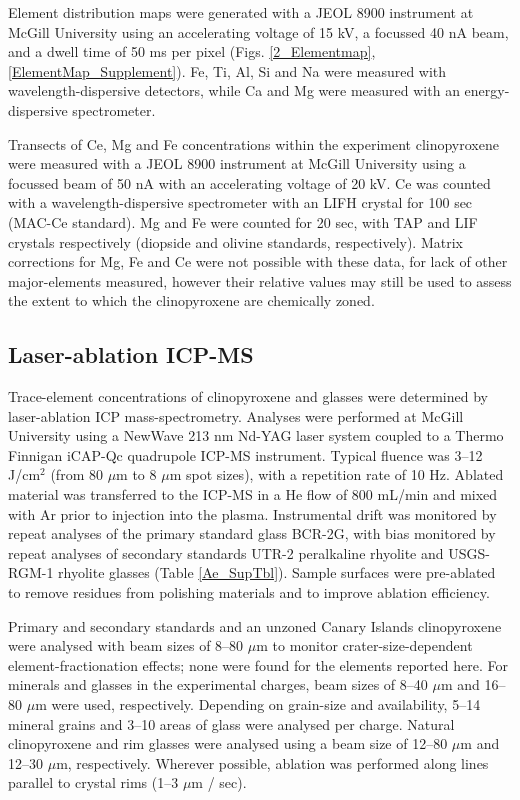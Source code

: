 \documentclass[review,authoryear,12pt]{elsarticle}
\begin{document}
Element distribution maps were generated with a JEOL 8900 instrument at McGill University using an accelerating voltage of 15 kV, a focussed 40 nA beam, and a dwell time of 50 ms per pixel (Figs. \ref{2_Elementmap}, \ref{ElementMap_Supplement}). Fe, Ti, Al, Si and Na were measured with wavelength-dispersive detectors, while Ca and Mg were measured with an energy-dispersive spectrometer.

Transects of Ce, Mg and Fe concentrations within the experiment clinopyroxene were measured with a JEOL 8900 instrument at McGill University using a focussed beam of 50 nA with an accelerating voltage of 20 kV. Ce was counted with a wavelength-dispersive spectrometer with an LIFH crystal for 100 sec (MAC-Ce standard). Mg and Fe were counted for 20 sec, with TAP and LIF crystals respectively (diopside and olivine standards, respectively). Matrix corrections for Mg, Fe and Ce were not possible with these data, for lack of other major-elements measured, however their relative values may still be used to assess the extent to which the clinopyroxene are chemically zoned.  

\subsection{Laser-ablation ICP-MS}
Trace-element concentrations of clinopyroxene and glasses were determined by laser-ablation ICP mass-spectrometry. Analyses were performed at McGill University using a NewWave 213 nm Nd-YAG laser system coupled to a Thermo Finnigan iCAP-Qc quadrupole ICP-MS instrument. Typical fluence was 3--12 J/cm$^2$ (from 80 $\mu$m to 8 $\mu$m spot sizes), with a repetition rate of 10 Hz. Ablated material was transferred to the ICP-MS in a He flow of 800 mL/min and mixed with Ar prior to injection into the plasma. Instrumental drift was monitored by repeat analyses of the primary standard glass BCR-2G, with bias monitored by repeat analyses of secondary standards UTR-2 peralkaline rhyolite and USGS-RGM-1 rhyolite glasses (Table \ref{Ae_SupTbl}). Sample surfaces were pre-ablated to remove residues from polishing materials and to improve ablation efficiency. 

Primary and secondary standards and an unzoned Canary Islands clinopyroxene were analysed with beam sizes of 8--80 $\mu$m to monitor crater-size-dependent element-fractionation effects; none were found for the elements reported here. For minerals and glasses in the experimental charges, beam sizes of 8--40 $\mu$m and 16--80 $\mu$m were used, respectively. Depending on grain-size and availability, 5--14 mineral grains and 3--10 areas of glass were analysed per charge. Natural clinopyroxene and rim glasses were analysed using a beam size of 12--80 $\mu$m and 12--30 $\mu$m, respectively. Wherever possible, ablation was performed along lines parallel to crystal rims (1--3 $\mu$m / sec).
\end{document}
